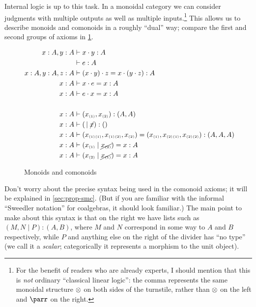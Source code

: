 \begin{props}
Internal logic is up to this task.
In a monoidal category we can consider judgments with multiple outputs as well as multiple inputs.\footnote{For the benefit of readers who are already experts, I should mention that this is \emph{not} ordinary ``classical linear logic'': the comma represents the same monoidal structure $\otimes$ on both sides of the turnstile, rather than $\otimes$ on the left and $\parr$ on the right.}
This allows us to describe monoids and comonoids in a roughly ``dual'' way; compare the first and second groups of axioms in \cref{fig:intro-prop-moncomon}.

\begin{figure}
  \centering
  \begin{align*}
    x:A, y:A &\vdash x\cdot y:A\\
    &\vdash e:A\\
    x:A,y:A,z:A &\vdash (x\cdot y)\cdot z = x\cdot (y\cdot z) :A\\
    x:A &\vdash x\cdot e=x:A\\
    x:A &\vdash e\cdot x=x:A\\
    \\
    x:A &\vdash (x_{\scriptscriptstyle(1)},x_{\scriptscriptstyle(2)}):(A,A)\\
    x:A &\vdash (\,\mid\cancel{x}):()\\
    x:A &\vdash (x_{\scriptscriptstyle(1)}{}_{\scriptscriptstyle(1)},x_{\scriptscriptstyle(1)}{}_{\scriptscriptstyle(2)},x_{\scriptscriptstyle(2)})=(x_{\scriptscriptstyle(1)},x_{\scriptscriptstyle(2)}{}_{\scriptscriptstyle(1)},x_{\scriptscriptstyle(2)}{}_{\scriptscriptstyle(2)}):(A,A,A)\\
    x:A &\vdash (x_{\scriptscriptstyle(1)}\mid\cancel{x_{\scriptscriptstyle(2)}}) = x:A\\
    x:A &\vdash (x_{\scriptscriptstyle(2)}\mid\cancel{x_{\scriptscriptstyle(1)}}) = x:A
  \end{align*}
  \caption{Monoids and comonoids}
  \label{fig:intro-prop-moncomon}
\end{figure}

Don't worry about the precise syntax being used in the comonoid axioms; it will be explained in \cref{sec:prop-smc}.
(But if you are familiar with the informal ``Sweedler notation'' for coalgebras, it should look familiar.)
The main point to make about this syntax is that on the right we have lists such as $(M,N\mid P):(A,B)$, where $M$ and $N$ correspond in some  way to $A$ and $B$ respectively, while $P$ and anything else on the right of the divider has ``no type'' (we call it a \emph{scalar}; categorically it represents a morphism to the unit object).


\end{props}
